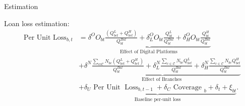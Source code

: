 \documentclass[notes,10pt, aspectratio=169]{beamer}
\newenvironment{wideitemize}{\itemize\addtolength{\itemsep}{10pt}}{\enditemize}
\begin{document}
\begin{frame}{Estimation}

        \vspace{0.3cm}
        \begin{wideitemize}
            \item 
            
            
 Loan loss estimation:
            $$
            \begin{aligned}
            \text { Per Unit } \operatorname{Loss}_{b, t} & =\underbrace{\delta^O O_{b t} \frac{\left(Q_{b c t}^L+Q_{b c t}^H\right)}{Q_{b t}^{B a l}}+\delta_L^O O_{b t} \frac{Q_{b t}^L}{Q_{b t}^{B a l}}+\delta_H^O O_{b t} \frac{Q_{b t}^H}{Q_{b t}^{B a l}}}_{\text {Effect of Digital Platforms }} \\
            & +\underbrace{\delta^N \frac{\sum_{c c \mathcal{C}} N_{b c}\left(Q_{b c t}^L+Q_{b c t}^H\right)}{Q_{b t}^{B a l}}+\delta_L^N \frac{\sum_{c \in \mathcal{C}} N_{b c} Q_{b c t}^L}{Q_{b t}^{B a l}}+\delta_H^N \frac{\sum_{c \in \mathcal{C}} N_{b c} Q_{b c t}^H}{Q_{b t}^{B a l}}}_{\text {Effect of Branches }} \\
            & \underbrace{+\delta_U \text { Per Unit } \operatorname{Loss}_{b, t-1}+\delta_C \text { Coverage }_b+\delta_t+\xi_{b t} }_{\text {Baseline per-unit loss}}  .
            \end{aligned}
            $$
       
    \end{wideitemize}

\end{frame}
\end{document}
